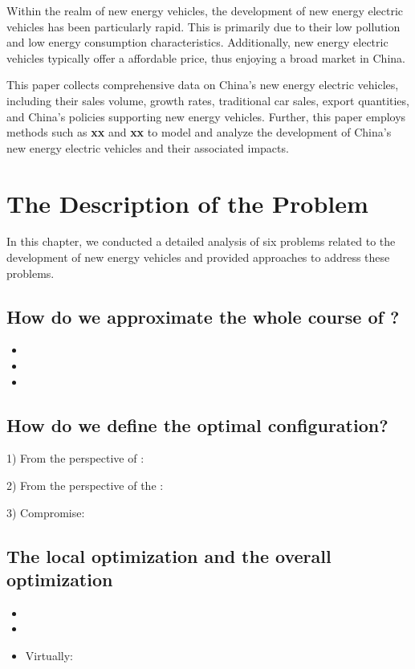 \documentclass{apmcmthesis}
\begin{document}
Within the realm of new energy vehicles, the development of new energy electric vehicles has been particularly rapid. This is primarily due to their low pollution and low energy consumption characteristics. Additionally, new energy electric vehicles typically offer a affordable price, thus enjoying a broad market in China.

This paper collects comprehensive data on China's new energy electric vehicles, including their sales volume, growth rates, traditional car sales, export quantities, and China's policies supporting new energy vehicles. Further, this paper employs methods such as \textbf{xx} and \textbf{xx} to model and analyze the development of China's new energy electric vehicles and their associated impacts.


\section{The Description of the Problem}

In this chapter, we conducted a detailed analysis of six problems related to the development of new energy vehicles and provided approaches to address these problems.

\subsection{How do we approximate the whole course of ?}

\begin{itemize}
  \item
  \item
  \item
\end{itemize}


\subsection{How do we define the optimal configuration?}
1) From the perspective of      :\par
2) From the perspective of the      :\par
3) Compromise:

\subsection{The local optimization and the overall optimization}


\begin{itemize}
  \item
  \item
  \item Virtually:
\end{itemize}
\end{document}
